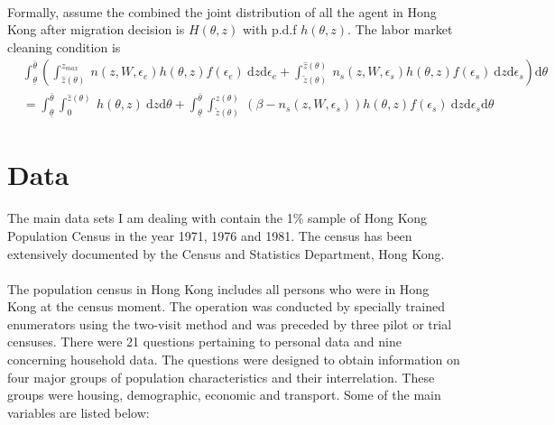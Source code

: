 \documentclass[12pt]{article}
\begin{document}
\paragraph{}
Formally, assume the combined the joint distribution of all the agent in Hong Kong after migration decision is $H(\theta,z)$ with p.d.f $h(\theta,z)$. The labor market cleaning condition is
\begin{align*}
&\int_{\underline{\theta}}^{\bar{\theta}}(\int_{\hat{z}(\theta)}^{z_{max}}  \: n(z,W,\epsilon_e)h(\theta,z)f(\epsilon_e)\: \mathrm{d}z \mathrm{d}\epsilon_e+ \int_{\tilde{z}(\theta)}^{\hat{z}(\theta)}  \: n_s(z,W,\epsilon_s)h(\theta,z)f(\epsilon_s)\: \mathrm{d}z \mathrm{d}\epsilon_s )\mathrm{d}\theta\\& =\int_{\underline{\theta}}^{\bar{\theta}}\int_{0}^{\hat{z}(\theta)}\: h(\theta,z)\: \mathrm{d}z\mathrm{d}\theta+\int_{\underline{\theta}}^{\bar{\theta}} \int_{\tilde{z}(\theta)}^{\hat{z}(\theta)}  \: (\beta-n_s(z,W,\epsilon_s))h(\theta,z)f(\epsilon_s)\: \mathrm{d}z \mathrm{d}\epsilon_s\mathrm{d}\theta
\end{align*}

\bigskip
\bigskip

\section{Data}
\paragraph{}
The main data sets I am dealing with contain the 1\% sample of Hong Kong Population Census in the year 1971, 1976 and 1981. The census has been extensively documented by the Census and Statistics Department, Hong Kong.

\paragraph{}
The population census in Hong Kong includes all persons who were in Hong Kong at the census moment. The operation was conducted by specially trained enumerators using the two-visit method and was preceded by three pilot or trial censuses. There were 21 questions pertaining to personal data and nine concerning household data. The questions were designed to obtain information on four major groups of population characteristics and their interrelation. These groups were housing, demographic, economic and transport. Some of the main variables are listed below: 
\end{document}
